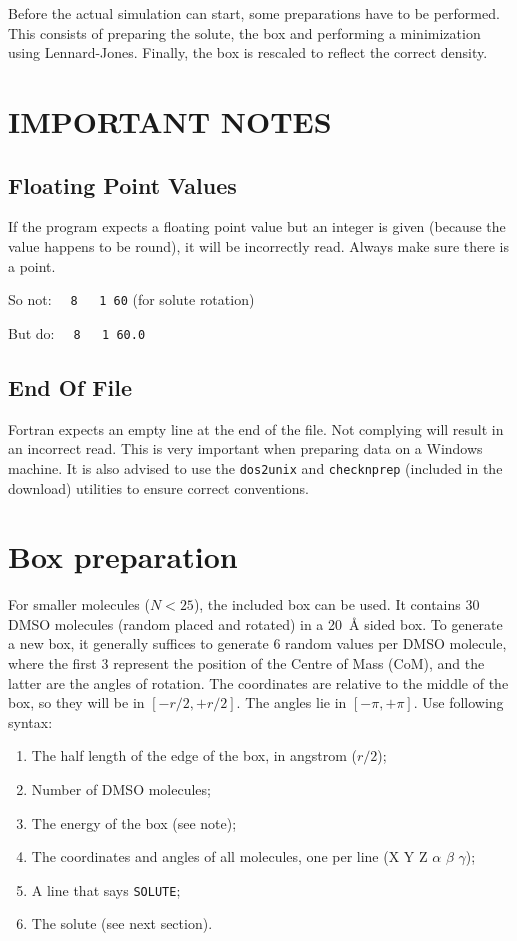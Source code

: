 Before the actual simulation can start, some preparations have to be performed.
This consists of preparing the solute, the box and performing a minimization 
using Lennard-Jones. Finally, the box is rescaled to reflect the correct 
density.

\section{IMPORTANT NOTES}
\subsection{Floating Point Values}
If the program expects a floating point value but an integer is given (because 
the value happens to be round), it will be incorrectly read. Always make sure 
there is a point.

So not: \verb|  8   1 60| (for solute rotation)

But do: \verb|  8   1 60.0|

\subsection{End Of File}
Fortran expects an empty line at the end of the file. Not complying will result 
in an incorrect read. This is very important when preparing data on a Windows 
machine. It is also advised to use the \verb|dos2unix| and \verb|checknprep| 
(included in the download) utilities to ensure correct conventions.

\section{Box preparation}
For smaller molecules ($N < 25$), the included box can be used. It contains 30 
DMSO molecules (random placed and rotated) in a \SI{20}{\angstrom} sided box.
To generate a new box, it generally suffices to generate 6 random values per 
DMSO molecule, where the first 3 represent the position of the Centre of Mass 
(CoM), and the latter are the angles of rotation. The coordinates are relative 
to the middle of the box, so they will be in $[-r/2, +r/2]$. The angles lie in 
$[-\pi, +\pi]$. Use following syntax:

\begin{enumerate}
	\item The half length of the edge of the box, in angstrom ($r/2$);
	\item Number of DMSO molecules;
	\item The energy of the box (see note);
	\item The coordinates and angles of all molecules, one per line (X Y Z 
	$\alpha$ $\beta$ $\gamma$);
	\item A line that says \verb|SOLUTE|;
	\item The solute (see next section).
\end{enumerate}

